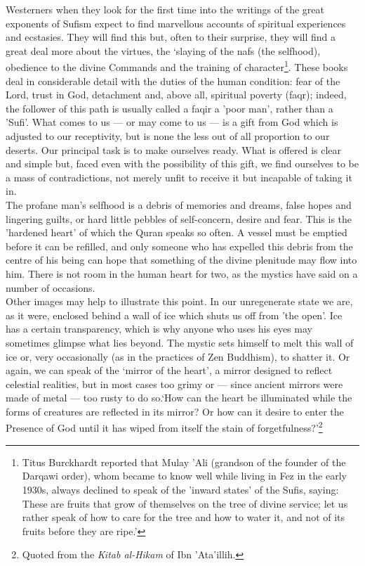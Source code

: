 \documentclass[10pt, twoside,openright]{book}
\begin{document}
Westerners when they look for the first time into the writings of the great exponents of Sufism 
expect to find marvellous accounts of spiritual experiences and ecstasies. They will find this but, 
often to their surprise, they will find a great deal more about the virtues, the `slaying of the nafs 
(the selfhood), obedience to the divine Commands and the training of character\footnote{Titus Burckhardt reported that Mulay 'Ali (grandson of the founder of the Darqawi order), whom 
became to know well while living in Fez in the early 1930s, always declined to speak of the 'inward 
states' of the Sufis, saying: These are fruits that grow of themselves on the tree of divine service; 
let us rather speak of how to care for the tree and how to water it, and not of its fruits before 
they are ripe.' }. These books 
deal in considerable detail with the duties of the human condition: fear of the Lord, trust in God, 
detachment and, above all, spiritual poverty (faqr); indeed, the follower of this path is usually 
called a faqir a 'poor man', rather than a 'Sufi'. What comes to us --- or may come to us --- is a gift 
from God which is adjusted to our receptivity, but is none the less out of all proportion to our 
deserts. Our principal task is to make ourselves ready. What is offered is clear and simple but, 
faced even with the possibility of this gift, we find ourselves to be a mass of contradictions, not 
merely unfit to receive it but incapable of taking it in. \\

The profane man's selfhood is a debris of memories and dreams, false hopes and lingering guilts, or 
hard little pebbles of self\hyp{}concern, desire and fear. This is the 'hardened heart' of which the Quran 
speaks so often. A vessel must be emptied before it can be refilled, and only someone who has 
expelled this debris from the centre of his being can hope that something of the divine plenitude may 
flow into him. There is not room in the human heart for two, as the mystics have said on a number of 
occasions. \\

Other images may help to illustrate this point. In our unregenerate state we are, as it were, 
enclosed behind a wall of ice which shuts us off from 'the open'. Ice has a certain transparency, 
which is why anyone who uses his eyes may sometimes glimpse what lies beyond. The mystic sets himself 
to melt this wall of ice or, very occasionally (as in the practices of Zen Buddhism), to shatter it. 
Or again, we can speak of the `mirror of the heart', a mirror designed to reflect celestial 
realities, but in most cases too grimy or --- since ancient mirrors were made of metal --- too rusty to 
do so.`How can the heart be illuminated while the forms of creatures are reflected in its mirror? Or how can it desire to enter the Presence of God until it has wiped from itself the stain of 
forgetfulness?'\footnote{Quoted from the \emph{Kitab al\hyp{}Hikam} of Ibn 'Ata'illih.}\\
\end{document}
